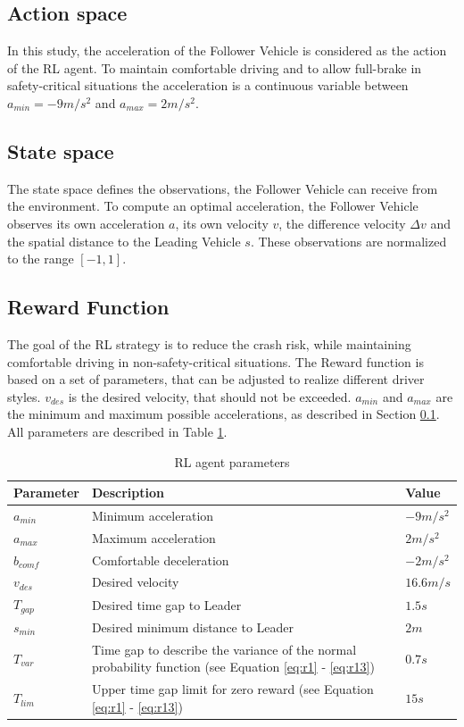 \documentclass[review]{elsarticle}
\begin{document}
\subsection{Action space}
\label{actionSpace}
In this study, the acceleration of the Follower Vehicle is considered as the action of the RL agent. To maintain  comfortable driving and to allow full-brake in safety-critical situations the acceleration is a continuous variable between $a_{min} = -9m/s^2$ and $a_{max} = 2m/s^2$.


\subsection{State space}
The state space defines the observations, the Follower Vehicle can receive from the environment. To compute an optimal acceleration, the Follower Vehicle observes its own acceleration $a$, its own velocity $v$, the difference velocity $\Delta v$ and the spatial distance to the Leading Vehicle $s$. These observations are normalized to the range $[-1,1]$.


\subsection{Reward Function}
\label{rewardFunction}
The goal of the RL strategy is to reduce the crash risk, while maintaining comfortable driving in non-safety-critical situations. The Reward function is based on a set of parameters, that can be adjusted to realize different driver styles. $v_{des}$ is the desired velocity, that should not be exceeded. $a_{min}$ and $a_{max}$ are the minimum and maximum possible accelerations, as described in Section \ref{actionSpace}. All parameters are described in Table \ref{tab:agentParameters}.

\begin{table}
\caption{RL agent parameters} 
\label{tab:agentParameters} 
\begin{center}
\begin{tabular}{ p{} p{} p{}}
	Parameter & Description & Value \\ \hline
	$a_{min}$ & Minimum acceleration & $-9m/s^2$ \\  
	$a_{max}$ & Maximum acceleration & $2m/s^2$ \\  
	$b_{comf}$ & Comfortable deceleration & $-2m/s^2$ \\  
	$v_{des}$ & Desired velocity & $16.6 m/s$ \\  		
	$T_{gap}$ & Desired time gap to Leader & $1.5s$ \\
	$s_{min}$ & Desired minimum distance to Leader & $2m$ \\
	$T_{var}$ & Time gap to describe the variance of the normal probability function (see Equation \ref{eq:r1} - \ref{eq:r13}) & $0.7s$ \\
	$T_{lim}$ & Upper time gap limit for zero reward (see Equation \ref{eq:r1} - \ref{eq:r13}) & $15s$ 
\end{tabular}
\end{center}
\end{table}
\end{document}
